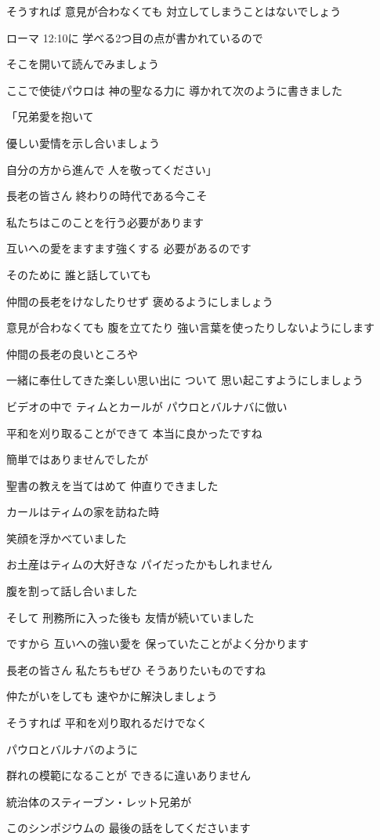 \documentclass[twocolumn]{jsarticle}
\begin{document}
そうすれば 意見が合わなくても
対立してしまうことはないでしょう

ローマ 12:10に
学べる2つ目の点が書かれているので

そこを開いて読んでみましょう

ここで使徒パウロは 神の聖なる力に
導かれて次のように書きました

「兄弟愛を抱いて

優しい愛情を示し合いましょう

自分の方から進んで
人を敬ってください」

長老の皆さん
終わりの時代である今こそ

私たちはこのことを行う必要があります

互いへの愛をますます強くする
必要があるのです

そのために 誰と話していても

仲間の長老をけなしたりせず
褒めるようにしましょう

意見が合わなくても 腹を立てたり
強い言葉を使ったりしないようにします

仲間の長老の良いところや

一緒に奉仕してきた楽しい思い出に
ついて 思い起こすようにしましょう

ビデオの中で ティムとカールが
パウロとバルナバに倣い

平和を刈り取ることができて
本当に良かったですね

簡単ではありませんでしたが

聖書の教えを当てはめて
仲直りできました

カールはティムの家を訪ねた時

笑顔を浮かべていました

お土産はティムの大好きな
パイだったかもしれません

腹を割って話し合いました

そして 刑務所に入った後も
友情が続いていました

ですから 互いへの強い愛を
保っていたことがよく分かります

長老の皆さん 私たちもぜひ
そうありたいものですね

仲たがいをしても
速やかに解決しましょう

そうすれば
平和を刈り取れるだけでなく

パウロとバルナバのように

群れの模範になることが
できるに違いありません

統治体のスティーブン・レット兄弟が

このシンポジウムの
最後の話をしてくださいます
\end{document}
